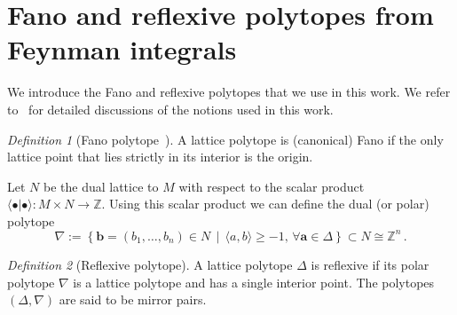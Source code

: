 \documentclass[12pt,a4paper]{article}
\theoremstyle{plain}
\theoremstyle{remark}
\newtheorem{defn}{Definition}[section]
\newcommand{\undernotation}[1]{\pmb{#1}}
\begin{document}
\section{Fano and reflexive polytopes from Feynman integrals}\label{sec:reflexivefano}

		\newcommand{			\PolarPolytope}{\nabla}

We introduce the Fano and reflexive polytopes that we use in this work. 
  We refer to~\cite{CoxKatz1999,Nill2005,Kasprzyk12,Telen:2022}  for detailed discussions of the notions used in
		this work.
        
		\begin{defn}[Fano polytope~\cite{Nill2005, Kasprzyk12}]
			A lattice polytope is (canonical) Fano if the only lattice point that lies strictly
			in its interior is the origin.
		\end{defn}
		Let $N$ be
		the  dual lattice to $M$ with respect to the scalar
		product $\langle \bullet| \bullet\rangle: M\times N\to \mathbb Z$.
		Using this scalar product we can define the dual (or polar) polytope
		\begin{equation}
			\PolarPolytope:=\left\{\undernotation b=(b_1,\dots,b_n)\in N \, \middle| \, \langle
			a,b\rangle\geq-1, \, \forall \undernotation a\in \Delta\right\}\subset N\cong \mathbb Z^n\,.  
		\end{equation}
		
		
		\begin{defn}[Reflexive polytope]
			A  lattice polytope $\Delta$ is reflexive if its polar
			polytope $\PolarPolytope$ is a lattice polytope and has a single interior
			point. The polytopes $(\Delta,\PolarPolytope)$ are said to be
			mirror pairs.
			
		\end{defn}
		
	
                
              

                
                
\end{document}
